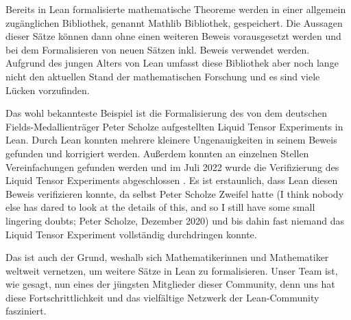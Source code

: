 \documentclass[10pt]{article}
\begin{document}
\noindent Bereits in Lean formalisierte mathematische Theoreme werden in einer allgemein zugänglichen Bibliothek, genannt Mathlib Bibliothek, gespeichert. Die Aussagen dieser Sätze können dann ohne einen weiteren Beweis vorausgesetzt werden und bei dem Formalisieren von neuen Sätzen inkl. Beweis verwendet werden. Aufgrund des jungen Alters von Lean umfasst diese Bibliothek aber noch lange nicht den aktuellen Stand der mathematischen Forschung und es sind viele Lücken vorzufinden. \cite{Q8}\par

\noindent Das wohl bekannteste Beispiel ist die Formalisierung des von dem deutschen Fields-Medallienträger Peter Scholze aufgestellten Liquid Tensor Experiments in Lean. Durch Lean konnten mehrere kleinere Ungenauigkeiten in seinem Beweis gefunden und korrigiert werden. Außerdem konnten an einzelnen Stellen Vereinfachungen gefunden werden und im Juli 2022 wurde die Verifizierung des Liquid Tensor Experiments abgeschlossen \cite{Q13}. Es ist erstaunlich, dass Lean diesen Beweis verifizieren konnte, da selbst Peter Scholze Zweifel hatte (\glqq I think nobody else has dared to look at the details of this, and so I still have some small lingering doubts\grqq; Peter Scholze, Dezember 2020) und bis dahin fast niemand das Liquid Tensor Experiment vollständig durchdringen konnte. 

\noindent Das ist auch der Grund, weshalb sich Mathematikerinnen und Mathematiker weltweit vernetzen, um weitere Sätze in Lean zu formalisieren. Unser Team ist, wie gesagt, nun eines der jüngsten Mitglieder dieser Community, denn uns hat diese Fortschrittlichkeit und das vielfältige Netzwerk der Lean-Community fasziniert. \\
\end{document}
